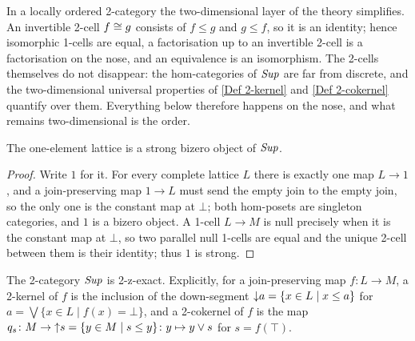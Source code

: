 \begin{remark}
  \label{Rem Locally Ordered}
  In a locally ordered 2-category the two-dimensional layer of the theory simplifies. An invertible 2-cell \(f\cong g\) consists of \(f\leq g\) and \(g\leq f\), so it is an identity; hence isomorphic 1-cells are equal, a factorisation up to an invertible 2-cell is a factorisation on the nose, and an equivalence is an isomorphism. The 2-cells themselves do not disappear: the hom-categories of \(\mathit{Sup}\) are far from discrete, and the two-dimensional universal properties of \ref{Def 2-kernel} and \ref{Def 2-cokernel} quantify over them. Everything below therefore happens on the nose, and what remains two-dimensional is the order.
\end{remark}

\begin{proposition}
  \label{P:SupBizero}   \leanok
  The one-element lattice is a strong bizero object of \(\mathit{Sup}\).
\end{proposition}

\begin{proof}
  
  \leanok
  Write \(1\) for it. For every complete lattice \(L\) there is exactly one map \(L\to 1\), and a join-preserving map \(1\to L\) must send the empty join to the empty join, so the only one is the constant map at \(\bot\); both hom-posets are singleton categories, and \(1\) is a bizero object. A 1-cell \(L\to M\) is null precisely when it is the constant map at \(\bot\), so two parallel null 1-cells are equal and the unique 2-cell between them is their identity; thus \(1\) is strong.
\end{proof}

\begin{proposition}
  \label{P:SupKernels}   \leanok
  The 2-category \(\mathit{Sup}\) is 2-z-exact. Explicitly, for a join-preserving map \(f\colon L\to M\), a 2-kernel of \(f\) is the inclusion of the down-segment \({\downarrow}a=\{x\in L\mid x\leq a\}\) for \(a=\bigvee\{x\in L\mid f(x)=\bot\}\), and a 2-cokernel of \(f\) is the map \(q_{s}\colon M\to{\uparrow}s=\{y\in M\mid s\leq y\}\colon y\mapsto y\vee s\) for \(s=f(\top)\).
\end{proposition}

